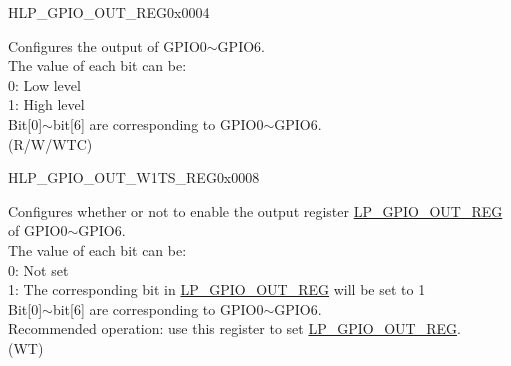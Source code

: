 \begin{register}{H}{LP\_GPIO\_OUT\_REG}{0x0004}\label{regdesc:LPGPIOOUTREG}
%
%
\regnewline%
\begin{regdesc}\begin{reglist}
\label{fielddesc:LPGPIOOUTDATAORIG}\item [LP\_GPIO\_OUT\_DATA\_ORIG] Configures the output of GPIO0$\sim$GPIO6.\\
The value of each bit can be:\\
0: Low level\\
1: High level\\
Bit[0]$\sim$bit[6] are corresponding to GPIO0$\sim$GPIO6.\\ (R/W/WTC)
\end{reglist}\end{regdesc}
\end{register}


\begin{register}{H}{LP\_GPIO\_OUT\_W1TS\_REG}{0x0008}\label{regdesc:LPGPIOOUTW1TSREG}
%
%
\regnewline%
\begin{regdesc}\begin{reglist}
\label{fielddesc:LPGPIOOUTW1TS}\item [LP\_GPIO\_OUT\_W1TS] Configures whether or not to enable the output register \hyperref[regdesc:LPGPIOOUTREG]{LP\_GPIO\_OUT\_REG} of GPIO0$\sim$GPIO6.\\
The value of each bit can be:\\
0: Not set\\
1: The corresponding bit in \hyperref[regdesc:LPGPIOOUTREG]{LP\_GPIO\_OUT\_REG} will be set to 1\\
Bit[0]$\sim$bit[6] are corresponding to GPIO0$\sim$GPIO6.\\
Recommended operation: use this register to set \hyperref[regdesc:LPGPIOOUTREG]{LP\_GPIO\_OUT\_REG}. \\
(WT)
\end{reglist}\end{regdesc}
\end{register}


